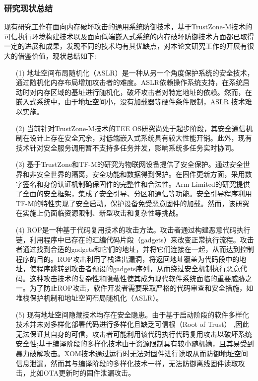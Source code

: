 \documentclass[12pt,a4paper]{ctexart}
\numberwithin{figure}{section}
\begin{document}
\subsubsection{研究现状总结}
\par 现有研究工作在面向内存破坏攻击的通用系统防御技术，基于TrustZone-M技术的可信执行环境构建技术以及面向低端嵌入式系统的内存破坏防御技术方面都已取得一定的进展和成果，发现不同的技术均有其优缺点，对本论文研究工作的开展有很大的借鉴价值，现状总结如下:
\begin{itemize}
    \item[(1)] 地址空间布局随机化（ASLR）是一种从另一个角度保护系统的安全技术，通过随机化内存布局增加攻击者的难度。ASLR依赖操作系统支持，在系统启动时对内存区域的基址进行随机化，破坏攻击者对特定地址的依赖。然而，在嵌入式系统中，由于地址空间小，没有加载器等硬件条件限制，ASLR 技术难以实施。
    \item[(2)] 当前针对TrustZone-M技术的TEE OS研究尚处于起步阶段，其安全通信机制在设计上存在安全冗余，对低端嵌入式系统具有较大性能开销。此外，现有技术针对安全服务调用暂不支持多任务并发，影响系统多任务实时协同。
    \item[(3)] 基于TrustZone和TF-M的研究为物联网设备提供了安全保护。通过安全世界和非安全世界的隔离，安全功能和数据得到保护。在固件更新方面，采用数字签名和身份认证机制确保固件的完整性和合法性。Arm Limited的研究提供了全面的安全框架，集成了安全引导、分区和通信等功能。安全引导程序利用TF-M的特性实现了安全启动，保护设备免受恶意固件的加载。然而，该研究在实施上仍面临资源限制、新型攻击和复杂性等挑战。
    \item[(4)]ROP是一种基于代码复用技术的攻击方法。攻击者通过构建恶意代码执行链，利用程序中已存在的汇编代码片段（gadgets）来改变正常执行流程。攻击者通过找到合适的gadgets和它们的地址，并将它们连接在一起，从而达到控制程序的目的。ROP攻击利用了栈溢出漏洞，将返回地址覆盖为代码段中的地址，使程序跳转到攻击者预设的gadgets序列，从而绕过安全机制执行恶意代码。这种攻击技术的复杂性和隐蔽性使其成为现代软件系统面临的重要威胁之一。为了防止ROP攻击，软件开发者需要采取严格的代码审查和安全措施，如堆栈保护机制和地址空间布局随机化（ASLR）。
    \item[(5)] 现有地址空间隐藏技术均存在安全隐患。由于基于启动阶段的软件多样化技术并未对多样化部署代码进行多样化且缺乏可信根（Root of Trust） ,因此无法保证其自身的可信，攻击者可能利用该代码执行代码复用攻击以破坏系统安全性;基于编译阶段的多样化技术由于资源限制具有较小随机嫡，且其易受到暴力破解攻击。XOM技术通过运行时无法对固件进行读取从而防御地址空间信息泄漏，然而其与编译阶段的多样化技术一样，无法防御离线固件读取攻击，比如OTA更新时的固件泄漏攻击。
\end{itemize}
\end{document}
